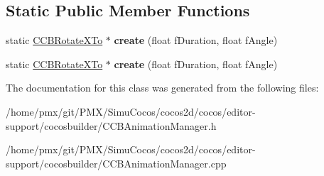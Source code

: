 \subsection*{Static Public Member Functions}
\begin{DoxyCompactItemize}
\item 
\mbox{\label{classcocosbuilder_1_1CCBRotateXTo_a232cc7d625872999b5f112f515c6f301}} 
static \hyperlink{classcocosbuilder_1_1CCBRotateXTo}{C\+C\+B\+Rotate\+X\+To} $\ast$ {\bfseries create} (float f\+Duration, float f\+Angle)
\item 
\mbox{\label{classcocosbuilder_1_1CCBRotateXTo_a53c012b8798c76d6e059053eb0a722bf}} 
static \hyperlink{classcocosbuilder_1_1CCBRotateXTo}{C\+C\+B\+Rotate\+X\+To} $\ast$ {\bfseries create} (float f\+Duration, float f\+Angle)
\end{DoxyCompactItemize}


The documentation for this class was generated from the following files\+:\begin{DoxyCompactItemize}
\item 
/home/pmx/git/\+P\+M\+X/\+Simu\+Cocos/cocos2d/cocos/editor-\/support/cocosbuilder/C\+C\+B\+Animation\+Manager.\+h\item 
/home/pmx/git/\+P\+M\+X/\+Simu\+Cocos/cocos2d/cocos/editor-\/support/cocosbuilder/C\+C\+B\+Animation\+Manager.\+cpp\end{DoxyCompactItemize}
